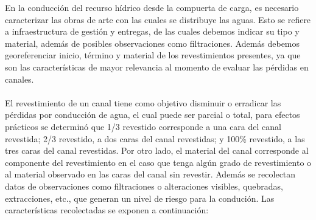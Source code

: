 \documentclass[]{article}
\begin{document}
En la conducción del recurso hídrico desde la compuerta de carga, es necesario caracterizar las obras de arte con las cuales se distribuye las aguas. Esto se refiere a infraestructura de gestión y entregas, de las cuales debemos indicar su tipo y material, además de posibles observaciones como filtraciones. Además debemos georeferenciar inicio, término y material de los revestimientos presentes, ya que son las características de mayor relevancia al momento de evaluar las pérdidas en canales. \\
\\
El revestimiento de un canal tiene como objetivo disminuir o erradicar las pérdidas por conducción de agua, el cual puede ser parcial o total, para efectos prácticos se determinó que 1/3 revestido corresponde a una cara del canal revestida; 2/3 revestido, a dos caras del canal revestidas; y 100\% revestido, a las tres caras del canal revestidas. Por otro lado, el material del canal corresponde al componente del revestimiento en el caso que tenga algún grado de revestimiento o al material observado en las caras del canal sin revestir. Además se recolectan datos de observaciones como filtraciones o alteraciones visibles, quebradas, extracciones, etc., que generan un nivel de riesgo para la condución. Las características recolectadas se exponen a continuación:\\
\\
\clearpage
\end{document}
